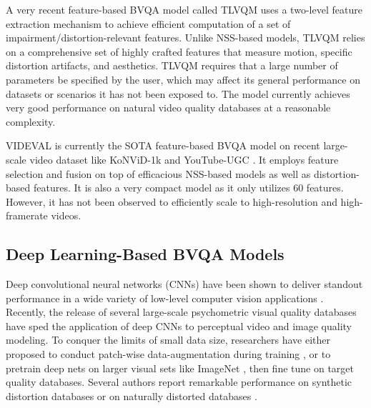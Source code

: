 \documentclass[transmag]{IEEEtran}
\begin{document}
A very recent feature-based BVQA model called TLVQM \cite{korhonen2019two} uses a two-level feature extraction mechanism to achieve efficient computation of a set of impairment/distortion-relevant features. Unlike NSS-based models, TLVQM relies on a comprehensive set of highly crafted features that measure motion, specific distortion artifacts, and aesthetics. TLVQM requires that a large number of parameters be specified by the user, which may affect its general performance on datasets or scenarios it has not been exposed to. The model currently achieves very good performance on natural video quality databases at a reasonable complexity.

VIDEVAL \cite{tu2020ugc} is currently the SOTA feature-based BVQA model on recent large-scale video dataset like KoNViD-1k \cite{hosu2017konstanz} and YouTube-UGC \cite{wang2019youtube}. It employs feature selection and fusion on top of efficacious NSS-based models as well as distortion-based features. It is also a very compact model as it only utilizes 60 features. However, it has not been observed to efficiently scale to high-resolution and high-framerate videos.

\subsection{Deep Learning-Based BVQA Models}
\label{ssec:deep_learning_bvqa_models}

Deep convolutional neural networks (CNNs) have been shown to deliver standout performance in a wide variety of low-level computer vision applications \cite{chen2020proxiqa, chen2020learning, ying2019patches, jiang2019enlightengan}. Recently, the release of several large-scale psychometric visual quality databases \cite{ghadiyaram2015massive, hosu2017konstanz, sinno2018large, hosu2020koniq, wang2019youtube} have sped the application of deep CNNs to perceptual video and image quality modeling. To conquer the limits of small data size, researchers have either proposed to conduct patch-wise data-augmentation during training \cite{kang2014convolutional, bosse2016deep, kim2017deep}, or to pretrain deep nets on larger visual sets like ImageNet \cite{deng2009imagenet}, then fine tune on target quality databases. Several authors report remarkable performance on synthetic distortion databases \cite{sheikh2006statistical,ponomarenko2013color} or on naturally distorted databases \cite{ghadiyaram2015massive, hosu2020koniq}.
\end{document}
